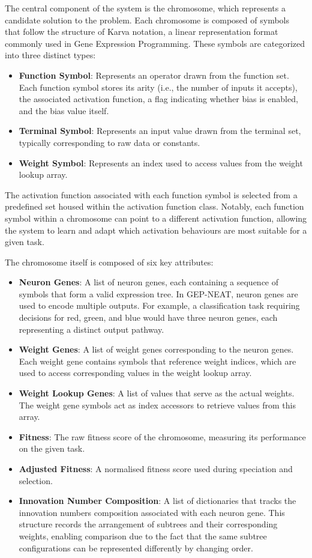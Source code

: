 \parbreak\noindent The central component of the system is the chromosome, which represents a candidate solution to the problem. Each chromosome is composed of symbols that follow the structure of Karva notation, a linear representation format commonly used in Gene Expression Programming. These symbols are categorized into three distinct types:
\begin{itemize}
    \item \textbf{Function Symbol}: Represents an operator drawn from the function set. Each function symbol stores its arity (i.e., the number of inputs it accepts), the associated activation function, a flag indicating whether bias is enabled, and the bias value itself.
    \item \textbf{Terminal Symbol}: Represents an input value drawn from the terminal set, typically corresponding to raw data or constants.
    \item \textbf{Weight Symbol}: Represents an index used to access values from the weight lookup array.
\end{itemize}

\parbreak\noindent The activation function associated with each function symbol is selected from a predefined set housed within the activation function class. Notably, each function symbol within a chromosome can point to a different activation function, allowing the system to learn and adapt which activation behaviours are most suitable for a given task.

\parbreak\noindent The chromosome itself is composed of six key attributes:
\begin{itemize}
    \item \textbf{Neuron Genes}: A list of neuron genes, each containing a sequence of symbols that form a valid expression tree. In GEP-NEAT, neuron genes are used to encode multiple outputs. For example, a classification task requiring decisions for red, green, and blue would have three neuron genes, each representing a distinct output pathway.
    \item \textbf{Weight Genes}: A list of weight genes corresponding to the neuron genes. Each weight gene contains symbols that reference weight indices, which are used to access corresponding values in the weight lookup array.
    \item \textbf{Weight Lookup Genes}: A list of values that serve as the actual weights. The weight gene symbols act as index accessors to retrieve values from this array.
    \item \textbf{Fitness}: The raw fitness score of the chromosome, measuring its performance on the given task.
    \item \textbf{Adjusted Fitness}: A normalised fitness score used during speciation and selection.
    \item \textbf{Innovation Number Composition}: A list of dictionaries that tracks the innovation numbers composition associated with each neuron gene. This structure records the arrangement of subtrees and their corresponding weights, enabling comparison due to the fact that the same subtree configurations can be represented differently by changing order.
\end{itemize}

